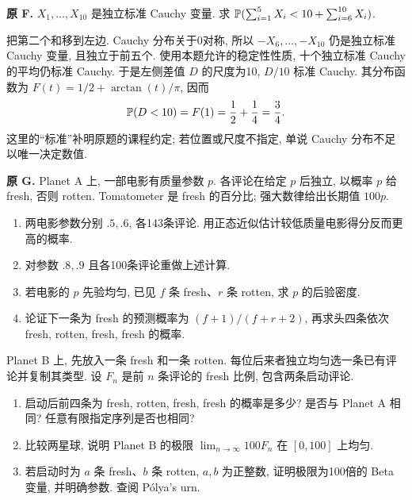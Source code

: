 \begin{exercise}\label{ex:P7.F}\label{part:P7.F}
\textbf{原 F.} $X_1,\ldots,X_{10}$ 是独立标准 Cauchy 变量. 求
$\mathbb P(\sum_{i=1}^5X_i<10+\sum_{i=6}^{10}X_i)$.
\end{exercise}
\begin{solution}\label{sol:P7.F}
把第二个和移到左边. Cauchy 分布关于0对称, 所以 $-X_6,\ldots,-X_{10}$ 仍是独立标准 Cauchy 变量, 且独立于前五个. 使用本题允许的稳定性性质, 十个独立标准 Cauchy 的平均仍标准 Cauchy. 于是左侧差值 $D$ 的尺度为10, $D/10$ 标准 Cauchy. 其分布函数为 $F(t)=1/2+\arctan(t)/\pi$, 因而
\[
 \mathbb P(D<10)=F(1)=\frac12+\frac14=\frac34.
\]
这里的“标准”补明原题的课程约定; 若位置或尺度不指定, 单说 Cauchy 分布不足以唯一决定数值.
\end{solution}

\begin{exercise}\label{ex:P7.G}
\textbf{原 G.} Planet A 上, 一部电影有质量参数 $p$. 各评论在给定 $p$ 后独立, 以概率 $p$ 给 fresh, 否则 rotten. Tomatometer 是 fresh 的百分比; 强大数律给出长期值 $100p$.
\begin{enumerate}[label=\arabic*.]
\item\label{part:P7.G.1} 两电影参数分别 $.5,.6$, 各143条评论. 用正态近似估计较低质量电影得分反而更高的概率.
\item\label{part:P7.G.2} 对参数 $.8,.9$ 且各100条评论重做上述计算.
\item\label{part:P7.G.3} 若电影的 $p$ 先验均匀, 已见 $f$ 条 fresh、$r$ 条 rotten, 求 $p$ 的后验密度.
\item\label{part:P7.G.4} 论证下一条为 fresh 的预测概率为 $(f+1)/(f+r+2)$, 再求头四条依次 fresh, rotten, fresh, fresh 的概率.
\end{enumerate}
Planet B 上, 先放入一条 fresh 和一条 rotten. 每位后来者独立均匀选一条已有评论并复制其类型. 设 $F_n$ 是前 $n$ 条评论的 fresh 比例, 包含两条启动评论.
\begin{enumerate}[label=\arabic*.,start=5]
\item\label{part:P7.G.5} 启动后前四条为 fresh, rotten, fresh, fresh 的概率是多少? 是否与 Planet A 相同? 任意有限指定序列是否也相同?
\item\label{part:P7.G.6} 比较两星球, 说明 Planet B 的极限 $\lim_{n\to\infty}100F_n$ 在 $[0,100]$ 上均匀.
\item\label{part:P7.G.7} 若启动时为 $a$ 条 fresh、$b$ 条 rotten, $a,b$ 为正整数, 证明极限为100倍的 Beta 变量, 并明确参数. 查阅 Pólya's urn.
\end{enumerate}
\end{exercise}
